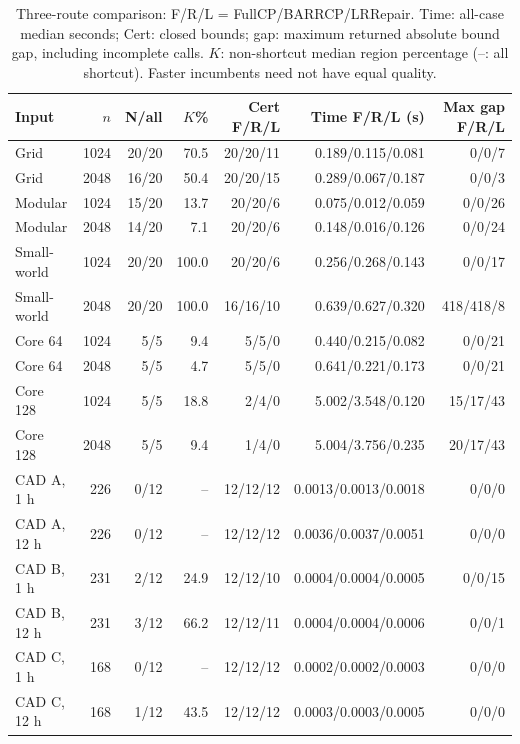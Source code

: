 \documentclass[conference]{IEEEtran}
\begin{document}
\begin{table}[t]
\caption{Three-route comparison: F/R/L = FullCP/BARRCP/LRRepair. Time: all-case median seconds; Cert: closed bounds; gap: maximum returned absolute bound gap, including incomplete calls. $K$: non-shortcut median region percentage (--: all shortcut). Faster incumbents need not have equal quality.}\label{tab:routes}
\centering\footnotesize
\begin{tabular}{@{}lrrrrrr@{}}
\toprule Input & $n$ & N/all & $K$\% & Cert F/R/L & Time F/R/L (s) & Max gap F/R/L\\\midrule
Grid & 1024 & 20/20 & 70.5 & 20/20/11 & 0.189/0.115/0.081 & 0/0/7 \\
Grid & 2048 & 16/20 & 50.4 & 20/20/15 & 0.289/0.067/0.187 & 0/0/3 \\
Modular & 1024 & 15/20 & 13.7 & 20/20/6 & 0.075/0.012/0.059 & 0/0/26 \\
Modular & 2048 & 14/20 & 7.1 & 20/20/6 & 0.148/0.016/0.126 & 0/0/24 \\
Small-world & 1024 & 20/20 & 100.0 & 20/20/6 & 0.256/0.268/0.143 & 0/0/17 \\
Small-world & 2048 & 20/20 & 100.0 & 16/16/10 & 0.639/0.627/0.320 & 418/418/8 \\
Core 64 & 1024 & 5/5 & 9.4 & 5/5/0 & 0.440/0.215/0.082 & 0/0/21 \\
Core 64 & 2048 & 5/5 & 4.7 & 5/5/0 & 0.641/0.221/0.173 & 0/0/21 \\
Core 128 & 1024 & 5/5 & 18.8 & 2/4/0 & 5.002/3.548/0.120 & 15/17/43 \\
Core 128 & 2048 & 5/5 & 9.4 & 1/4/0 & 5.004/3.756/0.235 & 20/17/43 \\
CAD A, 1 h & 226 & 0/12 & -- & 12/12/12 & 0.0013/0.0013/0.0018 & 0/0/0 \\
CAD A, 12 h & 226 & 0/12 & -- & 12/12/12 & 0.0036/0.0037/0.0051 & 0/0/0 \\
CAD B, 1 h & 231 & 2/12 & 24.9 & 12/12/10 & 0.0004/0.0004/0.0005 & 0/0/15 \\
CAD B, 12 h & 231 & 3/12 & 66.2 & 12/12/11 & 0.0004/0.0004/0.0006 & 0/0/1 \\
CAD C, 1 h & 168 & 0/12 & -- & 12/12/12 & 0.0002/0.0002/0.0003 & 0/0/0 \\
CAD C, 12 h & 168 & 1/12 & 43.5 & 12/12/12 & 0.0003/0.0003/0.0005 & 0/0/0 \\
\bottomrule\end{tabular}
\end{table}
\end{document}
